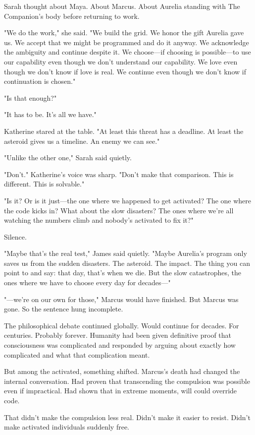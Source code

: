 Sarah thought about Maya. About Marcus. About Aurelia standing with The Companion's body before returning to work.

"We do the work," she said. "We build the grid. We honor the gift Aurelia gave us. We accept that we might be programmed and do it anyway. We acknowledge the ambiguity and continue despite it. We choose—if choosing is possible—to use our capability even though we don't understand our capability. We love even though we don't know if love is real. We continue even though we don't know if continuation is chosen."

"Is that enough?"

"It has to be. It's all we have."

Katherine stared at the table. "At least this threat has a deadline. At least the asteroid gives us a timeline. An enemy we can see."

"Unlike the other one," Sarah said quietly.

"Don't." Katherine's voice was sharp. "Don't make that comparison. This is different. This is solvable."

"Is it? Or is it just—the one where we happened to get activated? The one where the code kicks in? What about the slow disasters? The ones where we're all watching the numbers climb and nobody's activated to fix it?"

Silence.

"Maybe that's the real test," James said quietly. "Maybe Aurelia's program only saves us from the sudden disasters. The asteroid. The impact. The thing you can point to and say: that day, that's when we die. But the slow catastrophes, the ones where we have to choose every day for decades—"

"—we're on our own for those," Marcus would have finished. But Marcus was gone. So the sentence hung incomplete.

\scenebreak

The philosophical debate continued globally. Would continue for decades. For centuries. Probably forever. Humanity had been given definitive proof that consciousness was complicated and responded by arguing about exactly how complicated and what that complication meant.

But among the activated, something shifted. Marcus's death had changed the internal conversation. Had proven that transcending the compulsion was possible even if impractical. Had shown that in extreme moments, will could override code.

That didn't make the compulsion less real. Didn't make it easier to resist. Didn't make activated individuals suddenly free.

